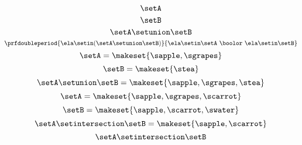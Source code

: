{\begin{forslides}
        \begin{equation}
            \label{eq:slides_session2_1}
            \setA
        \end{equation}
        \begin{equation}
            \label{eq:slides_session2_2}
            \setB
        \end{equation}
        \begin{equation}
            \label{eq:slides_session2_3}
            \setA \setunion \setB
        \end{equation}
        \begin{equation}
            \label{eq:slides_session2_4}
            \prfdoubleperiod
            {\ela \setin(\setA \setunion \setB)}{\ela \setin\setA \ \boolor\  \ela \setin\setB}
        \end{equation}
        \begin{equation}
            \label{eq:slides_session2_5}
            \setA = \makeset{ \sapple, \sgrapes }
        \end{equation}
        \begin{equation}
            \label{eq:slides_session2_6}
            \setB = \makeset{ \stea }
        \end{equation}
        \begin{equation}
            \label{eq:slides_session2_7}
            \setA \setunion \setB = \makeset{ \sapple, \sgrapes, \stea }
        \end{equation}
        \begin{equation}
            \label{eq:slides_session2_8}
            \setA = \makeset{ \sapple, \sgrapes, \scarrot }
        \end{equation}
        \begin{equation}
            \label{eq:slides_session2_9}
            \setB = \makeset{ \sapple, \scarrot, \swater }
        \end{equation}
        \begin{equation}
            \label{eq:slides_session2_10}
            \setA \setintersection \setB = \makeset{ \sapple, \scarrot }
        \end{equation}
        \begin{equation}
            \label{eq:slides_session2_11}
            \setA \setintersection \setB
        \end{equation}

\end{forslides}}

